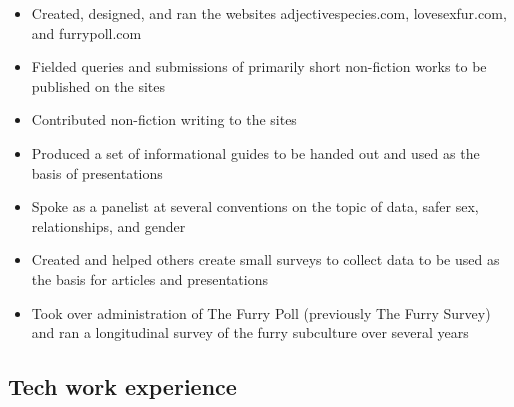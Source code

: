 \documentclass[letterpaper]{memoir}
\begin{document}
\begin{description}
\begin{itemize}
\tightlist
\item
  Created, designed, and ran the websites adjectivespecies.com,
  lovesexfur.com, and furrypoll.com
\item
  Fielded queries and submissions of primarily short non-fiction works
  to be published on the sites
\item
  Contributed non-fiction writing to the sites
\item
  Produced a set of informational guides to be handed out and used as
  the basis of presentations
\item
  Spoke as a panelist at several conventions on the topic of data, safer
  sex, relationships, and gender
\item
  Created and helped others create small surveys to collect data to be
  used as the basis for articles and presentations
\item
  Took over administration of The Furry Poll (previously The Furry
  Survey) and ran a longitudinal survey of the furry subculture over
  several years
\end{itemize}
\end{description}

\newpage

\subsection{Tech work experience}
\end{document}
